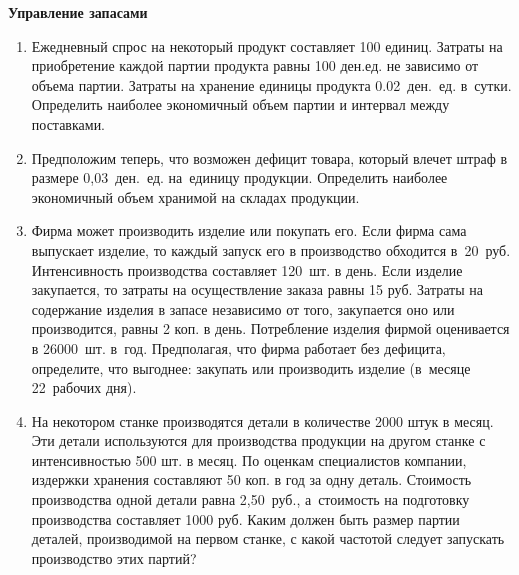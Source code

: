 \documentclass[a5paper,11pt]{extarticle}
\begin{document}
{
\bfseries Управление запасами
\par\vspace{1mm}
}
\begin{enumerate}
    \item Ежедневный спрос на некоторый продукт составляет 100 единиц.
    Затраты на приобретение каждой партии продукта равны 100 ден.\;ед. не зависимо от объема партии.
    Затраты на хранение единицы продукта 0.02~ден.~ед. в~сутки. 
    Определить наиболее экономичный объем партии и интервал между поставками.
    \item Предположим теперь, что возможен дефицит товара, который влечет штраф в размере 0,03~ден.~ед. на~единицу продукции. Определить наиболее экономичный объем хранимой на складах продукции.
    \item Фирма может производить изделие или покупать его. Если фирма сама выпускает изделие, то каждый запуск его в производство обходится в~20~руб. Интенсивность производства составляет 120~шт. в день. Если изделие закупается, то затраты на осуществление заказа равны 15 руб. Затраты на содержание изделия в запасе независимо от того, закупается оно или производится, равны 2 коп. в день. Потребление изделия фирмой оценивается в 26000~шт. в~год.
    Предполагая, что фирма работает без дефицита, определите, что выгоднее: закупать или производить изделие (в~месяце 22~рабочих дня).
    \item На некотором станке производятся детали в количестве 2000 штук в месяц. Эти детали используются для производства продукции на другом станке с интенсивностью 500 шт. в месяц. По оценкам специалистов компании, издержки хранения составляют 50 коп. в год за одну деталь. Стоимость производства одной детали равна 2,50~руб., а~стоимость на подготовку производства составляет 1000 руб. Каким должен быть размер партии деталей, производимой на первом станке, с какой частотой следует запускать производство этих партий?
\end{enumerate}
\end{document}
